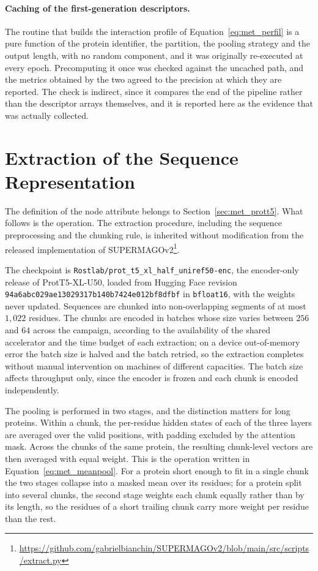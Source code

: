 \documentclass[Ingles]{ic-tese-v3}
\begin{document}
\begin{appendices}{}
\paragraph{Caching of the first-generation descriptors.} The routine that builds the interaction
profile of Equation~\eqref{eq:met_perfil} is a pure function of the protein identifier, the
partition, the pooling strategy and the output length, with no random component, and it was
originally re-executed at every epoch. Precomputing it once was checked against the uncached path,
and the metrics obtained by the two agreed to the precision at which they are reported. The check is
indirect, since it compares the end of the pipeline rather than the descriptor arrays themselves,
and it is reported here as the evidence that was actually collected.

\section{Extraction of the Sequence Representation}
\label{ape:prott5}

The definition of the node attribute belongs to Section~\ref{sec:met_prott5}. What follows is the
operation. The extraction procedure, including the sequence preprocessing and the chunking rule, is
inherited without modification from the released implementation of
SUPERMAGOv2\footnote{\url{https://github.com/gabrielbianchin/SUPERMAGOv2/blob/main/src/scripts/extract.py}}.

The checkpoint is \texttt{Rostlab/prot\_t5\_xl\_half\_uniref50-enc}, the encoder-only release of
ProtT5-XL-U50, loaded from Hugging Face revision \texttt{94a6abc029ae13029317b140b7424e012bf8dfbf} 
in \texttt{bfloat16}, with the weights never updated. Sequences are chunked into non-overlapping segments of at
most $1{,}022$ residues. The chunks are encoded in batches whose size varies between $256$ and $64$
across the campaign, according to the availability of the shared accelerator and the time budget of
each extraction; on a device out-of-memory error the batch size is halved and the batch retried, so
the extraction completes without manual intervention on machines of different capacities. The batch
size affects throughput only, since the encoder is frozen and each chunk is encoded independently.


The pooling is performed in two stages, and the distinction matters for long proteins. Within a
chunk, the per-residue hidden states of each of the three layers are averaged over the valid
positions, with padding excluded by the attention mask. Across the chunks of the same protein, the
resulting chunk-level vectors are then averaged with equal weight. This is the operation written in
Equation~\eqref{eq:met_meanpool}. For a protein short enough to fit in a single chunk the two stages
collapse into a masked mean over its residues; for a protein split into several chunks, the second
stage weights each chunk equally rather than by its length, so the residues of a short trailing
chunk carry more weight per residue than the rest.


\end{appendices}
\end{document}

